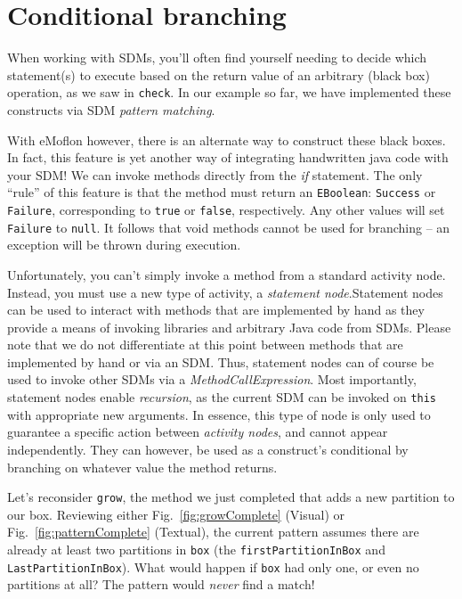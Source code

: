 \newpage
\hypertarget{sec:conBran}{}
\section{Conditional branching}
\genHeader

When working with SDMs, you'll often find yourself needing to decide which statement(s) to execute based on the return value of an arbitrary (black box)
operation, as we saw in \texttt{check}. In our example so far, we have implemented these constructs via SDM \emph{pattern matching}. 

With eMoflon however, there is an alternate way to construct these black boxes. In fact, this feature is yet another way of integrating handwritten java code
with your SDM! We can invoke methods directly from the \emph{if} statement. The only ``rule'' of this feature is that the method must return an
\texttt{EBoolean}: \texttt{Success} or \texttt{Failure}, corresponding to \texttt{true} or \texttt{false}, respectively. Any other values will set
\texttt{Failure} to \texttt{null}. It follows that void methods cannot be used for branching -- an exception will be thrown during execution.

Unfortunately, you can't simply invoke a method from a standard activity node. Instead, you must use a new type of activity, a \emph{statement
node}.Statement nodes can be used to interact with methods that are implemented by hand as they provide a means of invoking libraries and
arbitrary Java code from SDMs. Please note that we do not differentiate at this point between methods that are implemented by hand or via an SDM. Thus,
statement nodes can of course be used to invoke other SDMs via a \emph{MethodCallExpression}. Most importantly, statement nodes enable \emph{recursion}, as the
current SDM can be invoked on \texttt{this} with appropriate new arguments. In essence, this type of node is only used to guarantee a specific action
between \emph{activity nodes}, and cannot appear independently. They can however, be used as a construct's conditional by branching on whatever value the method
returns.

Let's reconsider \texttt{grow}, the method we just completed that adds a new partition to our box. Reviewing either Fig.~\ref{fig:growComplete} (Visual) or
Fig.~\ref{fig:patternComplete} (Textual), the current pattern assumes there are already at least two partitions in \texttt{box} (the
\texttt{firstPartitionInBox} and \texttt{LastPartitionInBox}). What would happen if \texttt{box} had only one, or even no partitions at all? The pattern would
\emph{never} find a match!

